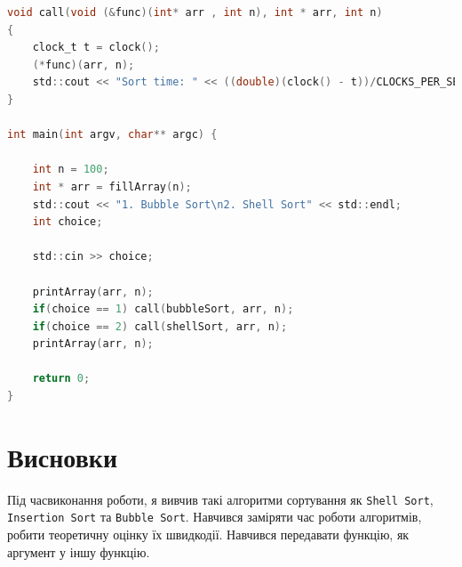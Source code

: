 \documentclass{article}
\begin{document}
\begin{lstlisting}[language=C]
void call(void (&func)(int* arr , int n), int * arr, int n)
{
	clock_t t = clock();
	(*func)(arr, n);
	std::cout << "Sort time: " << ((double)(clock() - t))/CLOCKS_PER_SEC << std::endl;
}

int main(int argv, char** argc) {
	
	int n = 100;
	int * arr = fillArray(n);
	std::cout << "1. Bubble Sort\n2. Shell Sort" << std::endl;
	int choice;
	
	std::cin >> choice;
	
	printArray(arr, n);
	if(choice == 1) call(bubbleSort, arr, n);
	if(choice == 2) call(shellSort, arr, n);
	printArray(arr, n);
	
	return 0;
}
\end{lstlisting}

\newpage
\section*{Висновки}
Під часвиконання роботи, я вивчив такі алгоритми сортування як \texttt{Shell Sort}, \texttt{Insertion Sort} та \texttt{Bubble Sort}.
Навчився заміряти час роботи алгоритмів, робити теоретичну оцінку їх швидкодії.
Навчився передавати функцію, як аргумент у іншу функцію.
\end{document}
